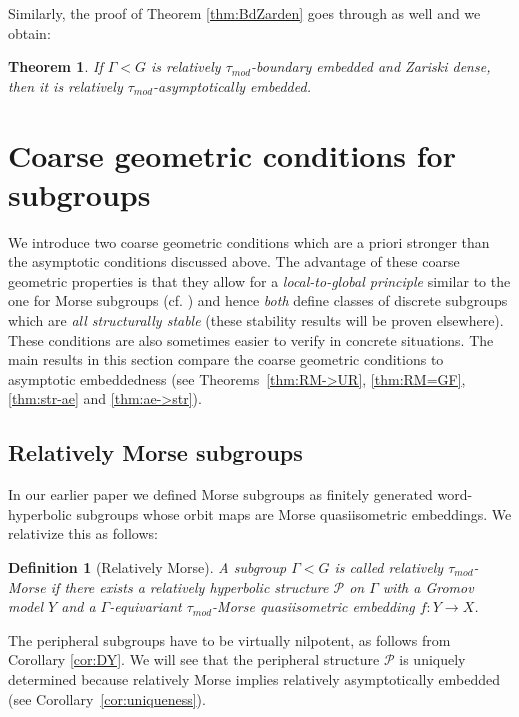 \documentclass[12pt]{article}
\theoremstyle{boldplain}
\newtheorem{thm}[equation]{Theorem}
\theoremstyle{bolddefinition}
\newtheorem{definition}[equation]{Definition}
\numberwithin{equation}{section}
\def\Ga{\Gamma}
\def\taumod{\tau_{mod}}
\begin{document}
{Similarly, the proof of Theorem \ref{thm:BdZarden} goes through as well and we obtain:}

\begin{thm}
\label{thm:BdZarden2}
{If $\Ga< G$ is relatively $\taumod$-boundary embedded and Zariski dense,
then it is relatively $\taumod$-asymptotically embedded. } 
\end{thm} 



\section{Coarse geometric conditions for subgroups}

We introduce two coarse geometric conditions 
which are a priori stronger than the asymptotic conditions discussed above.
The advantage of these coarse geometric properties is that they allow for a {\em local-to-global principle} 
similar to the one for Morse subgroups (cf. \cite[\S 7]{morse}) 
and hence {\em both} define classes of discrete subgroups which are {\em all structurally stable} ({these stability results will be proven elsewhere}). These conditions are also sometimes easier to verify in concrete situations. 
The main results in this section compare the coarse geometric conditions to asymptotic embeddedness
(see Theorems~\ref{thm:RM->UR}, \ref{thm:RM=GF}, \ref{thm:str-ae} and \ref{thm:ae->str}).

\subsection{Relatively Morse subgroups}
\label{sec:relmo}

In our earlier paper \cite{morse} 
we defined Morse subgroups as finitely generated word-hyperbolic subgroups 
whose orbit maps are Morse quasiisometric embeddings.
We relativize this as follows:

\begin{definition}[Relatively Morse]
\label{dfn:rlmrs}
A subgroup $\Ga<G$ is called {\em relatively $\taumod$-Morse}
if there exists a relatively hyperbolic structure ${\mathcal P}$ on $\Ga$ with a Gromov model $Y$
and a $\Ga$-equivariant $\taumod$-Morse quasiisometric embedding $f:Y\to X$.
\end{definition} 

The peripheral subgroups have to be virtually nilpotent, as follows from Corollary \ref{cor:DY}.
We will see that the peripheral structure ${\mathcal P}$ is uniquely determined
because relatively Morse implies relatively asymptotically embedded (see Corollary~\ref{cor:uniqueness}).
\end{document}
